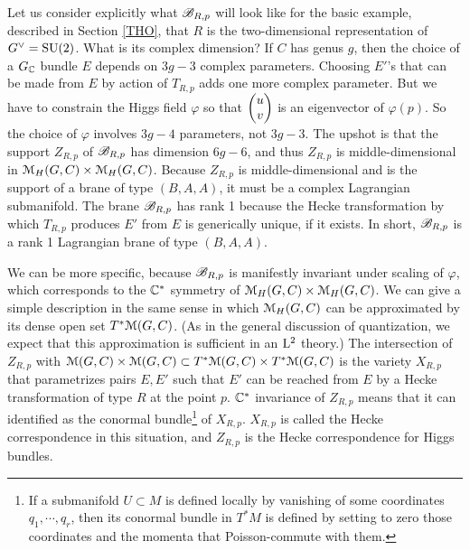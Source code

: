 \documentclass[11pt,a4paper]{article}
\begin{document}
Let us consider explicitly what ${\mathscr B}_{R,p}$ will look like for the basic example, described in Section \ref{THO},  that $R$ is the two-dimensional representation of $G^\vee={\mathrm{SU}}(2)$.
What is its complex dimension?   If $C$ has genus $g$, then the choice of a $G_{\mathbb C}$ bundle $E$ depends on $3g-3$ complex parameters.   Choosing 
$E'$'s that can be made from $E$ by action of $T_{R,p}$ adds one more complex parameter.    But we have to constrain the Higgs field $\varphi$
so that $\begin{pmatrix}u\cr v\end{pmatrix}$ is an eigenvector of $\varphi(p)$.   So the choice of $\varphi$ involves $3g-4$ parameters,
not $3g-3$.    The upshot is that the support $Z_{R,p}$ of ${\mathscr B}_{R,p}$ has dimension $6g-6$, and thus  $Z_{R,p}$ is middle-dimensional in ${\mathcal M}_H(G,C)\times {\mathcal M}_H(G,C)$.
Because $Z_{R,p}$ is middle-dimensional and is the support of a brane of type $(B,A,A)$, it must be a complex Lagrangian submanifold.
The brane  ${\mathscr B}_{R,p}$ has rank 1 because the Hecke transformation by which $T_{R,p}$ produces $E'$ from $E$ is
generically unique, if it exists.   In short, ${\mathscr B}_{R,p}$ is a rank 1 Lagrangian brane of type $(B,A,A)$.

We can be more specific, because ${\mathscr B}_{R,p}$ is manifestly invariant under scaling of $\varphi$, which corresponds to 
the ${\mathbb C}^*$ symmetry of ${\mathcal M}_H(G,C)\times {\mathcal M}_H(G,C)$.   We can give a simple
description in the same sense in which ${\mathcal M}_H(G,C)$ can be approximated by its dense open set
 $T^*{\mathcal M}(G,C)$. (As in the general discussion of quantization, we expect that this approximation is sufficient in an ${\mathrm L}^2$ theory.)
   The intersection of $Z_{R,p}$ with ${\mathcal M}(G,C)\times {\mathcal M}(G,C)\subset T^*{\mathcal M}(G,C)\times T^*{\mathcal M}(G,C)$ is the variety $X_{R,p}$
 that parametrizes pairs $E,E'$ such that $E'$ can be reached from $E$ by a Hecke transformation of type $R$ at the point $p$.   ${\mathbb C}^*$ invariance
 of $Z_{R,p} $ means that it can identified as the conormal bundle\footnote{If a submanifold $U\subset M$ is defined locally by vanishing of 
 some coordinates $q_1,\cdots, q_r$, then its conormal bundle in $T^*M$ is defined by setting to zero those coordinates and the momenta that
 Poisson-commute with them.}    of $X_{R,p}$.   $X_{R,p}$ is called the Hecke correspondence in this situation, and $Z_{R,p}$ is the Hecke correspondence
 for Higgs bundles.
   
\end{document}
